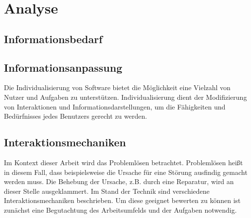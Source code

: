 
\chapter{Analyse}
\label{sec:Anforderungsanalyse}

\section{Informationsbedarf}

\section{Informationsanpassung}

Die Individualisierung von Software bietet die Möglichkeit eine Vielzahl von Nutzer und Aufgaben zu unterstützen. Individualisierung dient der Modifizierung von Interaktionen und Informationsdarstellungen, um die Fähigkeiten und Bedürfnisses jedes Benutzers gerecht zu werden.

\section{Interaktionsmechaniken}
Im Kontext dieser Arbeit wird das Problemlösen betrachtet. Problemlösen heißt in diesem Fall, dass beispielsweise die Ursache für eine Störung ausfindig gemacht werden muss. Die Behebung der Ursache, z.B. durch eine Reparatur, wird an dieser Stelle ausgeklammert. Im Stand der Technik sind verschiedene Interaktionsmechaniken beschrieben. Um diese geeignet bewerten zu können ist zunächst eine Begutachtung des Arbeitsumfelds und der Aufgaben notwendig.

